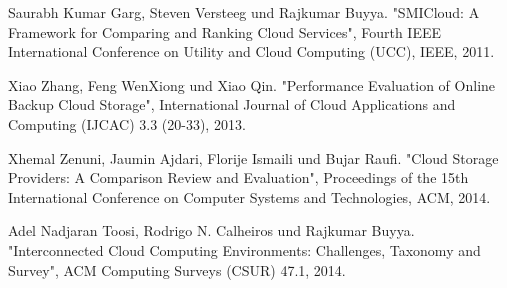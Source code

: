 \begin{thebibliography}{1}
Saurabh Kumar Garg, Steven Versteeg und Rajkumar Buyya. "SMICloud: A Framework for Comparing and Ranking Cloud Services", Fourth IEEE International Conference on Utility and Cloud Computing (UCC), IEEE, 2011.

Xiao Zhang, Feng WenXiong und Xiao Qin. "Performance Evaluation of Online Backup Cloud Storage", International Journal of Cloud Applications and Computing (IJCAC) 3.3 (20-33), 2013.

Xhemal Zenuni, Jaumin Ajdari, Florije Ismaili und Bujar Raufi. "Cloud Storage Providers: A Comparison Review and Evaluation", Proceedings of the 15th International Conference on Computer Systems and Technologies, ACM, 2014.

Adel Nadjaran Toosi, Rodrigo N. Calheiros und Rajkumar Buyya. "Interconnected Cloud Computing Environments: Challenges, Taxonomy and Survey", ACM Computing Surveys (CSUR) 47.1, 2014.

\end{thebibliography}